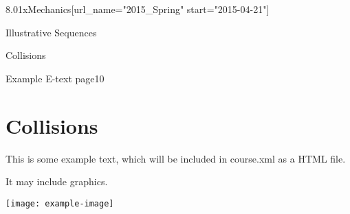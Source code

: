 \documentclass[12pt]{article}
\begin{document}
\begin{edXcourse}{8.01x}{Mechanics}[url_name="2015_Spring" start="2015-04-21"]

\begin{edXchapter}{Illustrative Sequences}

\begin{edXsection}{Collisions}

\begin{edXsequential}

\begin{edXproblem}{Example E-text page}{10}

\section{Collisions}  

This is some example text, which will be included in course.xml as a
HTML file.

It may include graphics.

\texttt{[image: example-image]}

\end{edXproblem}


\end{edXsequential}

\end{edXsection}
\end{edXchapter}
\end{edXcourse}
\end{document}

